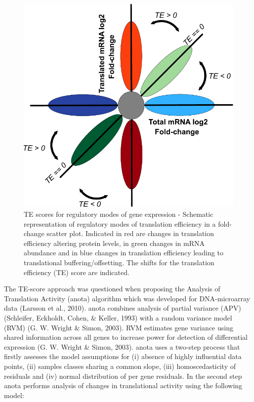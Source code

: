 \documentclass[12pt,openany]{book}
\begin{document}
\begin{figure}
  \includegraphics{./figures/geneModes_TE.pdf}
  \caption{TE scores for regulatory modes of gene expression -  Schematic representation of regulatory modes of translation efficiency in a fold-change scatter plot. Indicated in red are changes in translation efficiency altering protein levels, in green changes in mRNA abundance and in blue changes in translation efficiency leading to translational buffering/offsetting. The shifts for the translation efficiency (TE) score are indicated. \label{fig:TE}}
\end{figure}

The TE-score approach was questioned when proposing the Analysis of
Translation Activity (anota) algorithm which was developed for
DNA-microarray data (Larsson et al., 2010). anota combines analysis of
partial variance (APV) (Schleifer, Eckholdt, Cohen, \& Keller, 1993)
with a random variance model (RVM) (G. W. Wright \& Simon, 2003). RVM
estimates gene variance using shared information across all genes to
increase power for detection of differential expression (G. W. Wright \&
Simon, 2003). anota uses a two-step process that firstly assesses the
model assumptions for (i) absence of highly influential data points,
(ii) samples classes sharing a common slope, (iii) homoscedasticity of
residuals and (iv) normal distribution of per gene residuals. In the
second step anota performs analysis of changes in translational activity
using the following model:
\end{document}
